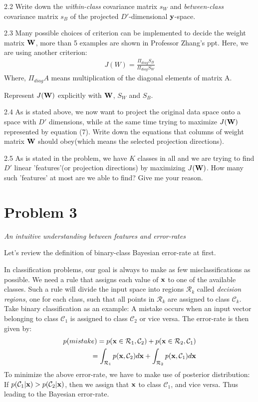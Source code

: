 \documentclass{article}
\theoremstyle{definition}
\theoremstyle{definition}
\theoremstyle{remark}
\begin{document}
2.2 Write down the \emph{within-class} covariance matrix $s_{W}$ and \emph{between-class} covariance matrix $s_{B}$ of the projected $D'$-dimensional $\bold{y}$-space.

2.3 Many possible choices of criterion can be implemented to decide the weight matrix $\bold{W}$, more than 5 examples are shown in Professor Zhang's ppt. Here, we are using another criterion:
\begin{eqnarray}
J(W)=\frac{\Pi_{diag}S_{B}}{\Pi_{diag}S_{W}}
\end{eqnarray}
Where, $\Pi_{diag}A$ means multiplication of the diagonal elements of matrix A.

Represent $J(\bold{W})$ explicitly with $\bold{W}$, $S_{W}$ and $S_{B}$.

2.4 As is stated above, we now want to project the original data space onto a space with $D'$ dimensions, while at the same time trying to maximize $J(\bold{W})$ represented by equation (7). Write down the equations that columns of weight matrix $\bold{W}$ should obey(which means the selected projection directions).

2.5 As is stated in the problem, we have $K$ classes in all and we are trying to find $D'$ linear 'features'(or projection directions) by maximizing $J(\bold{W})$. How many such 'features' at most are we able to find? Give me your reason.

\section*{Problem 3}\label{problem:3}
\emph{An intuitive understanding between features and error-rates}

Let's review the definition of binary-class Bayesian error-rate at first.

In classification problems, our goal is always to make as few misclassifications as possible. We need a rule that assigns each value of $\bold{x}$ to one of the available classes. Such a rule will divide the input space into regions $\mathcal{R}_{k}$ called \emph{decision regions}, one for each class, such that all points in $\mathcal{R}_{k}$ are assigned to class $\mathcal{C}_{k}$. Take binary classification as an example: A mistake occurs when an input vector belonging to class $\mathcal{C}_{1}$ is assigned to class $\mathcal{C}_{2}$ or vice versa. The error-rate is then given by:
\begin{eqnarray}
p(mistake)=p(\bold{x}\in \mathcal{R}_{1}, \mathcal{C}_{2})+p(\bold{x}\in \mathcal{R}_{2}, \mathcal{C}_{1})\\
=\int_{\mathcal{R}_{1}}p(\bold{x},\mathcal{C}_{2})d\bold{x}+\int_{\mathcal{R}_{2}}p(\bold{x},\mathcal{C}_{1})d\bold{x}
\end{eqnarray}
To minimize the above error-rate, we have to make use of posterior distribution: If $p(\mathcal{C}_{1}|\bold{x})>p(\mathcal{C}_{2}|\bold{x})$, then we assign that $\bold{x}$ to class $\mathcal{C}_{1}$, and vice versa. Thus leading to the Bayesian error-rate.
\end{document}
